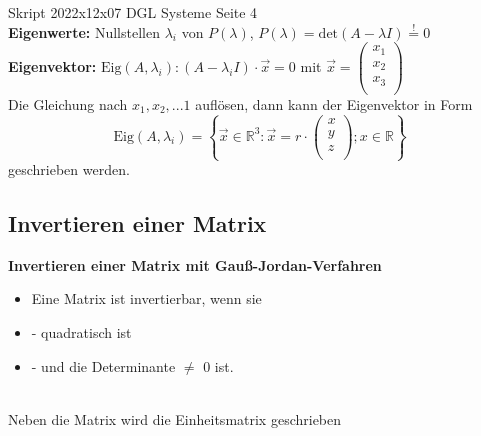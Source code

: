 Skript 2022x12x07 DGL Systeme Seite 4\\

\textbf{Eigenwerte:} Nullstellen $\lambda_i$ von $P(\lambda)$, $P(\lambda)=\text{det}(A-\lambda I) \stackrel{!}{=} 0$\\

\textbf{Eigenvektor:} $\text{Eig}(A, \lambda_i):(A-\lambda_i I)\cdot \vec{x} = 0$
mit $\vec{x} = \begin{pmatrix}
    x_1\\
    x_2\\
    x_3\\
\end{pmatrix}$\\
Die Gleichung nach $x_1,x_2,...1$ auflösen, dann kann der Eigenvektor in Form \\
\[\text{Eig}(A,\lambda_i)= \left\{ \vec{x} \in \mathbb{R}^3 : \vec{x} = r \cdot
\begin{pmatrix}
    x\\
    y\\
    z\\
\end{pmatrix} ; x \in \mathbb{R} \right\}\]
geschrieben werden.



\subsection{Invertieren einer Matrix}
\begin{boxedminipage}{\textwidth}
    \textbf{Invertieren einer Matrix mit Gauß-Jordan-Verfahren}
    \begin{itemize}
        \item Eine Matrix ist invertierbar, wenn sie
        \item - quadratisch ist
        \item - und die Determinante $\neq$ 0 ist.
    \end{itemize}
\end{boxedminipage}
\ \\

Neben die Matrix wird die Einheitsmatrix geschrieben

